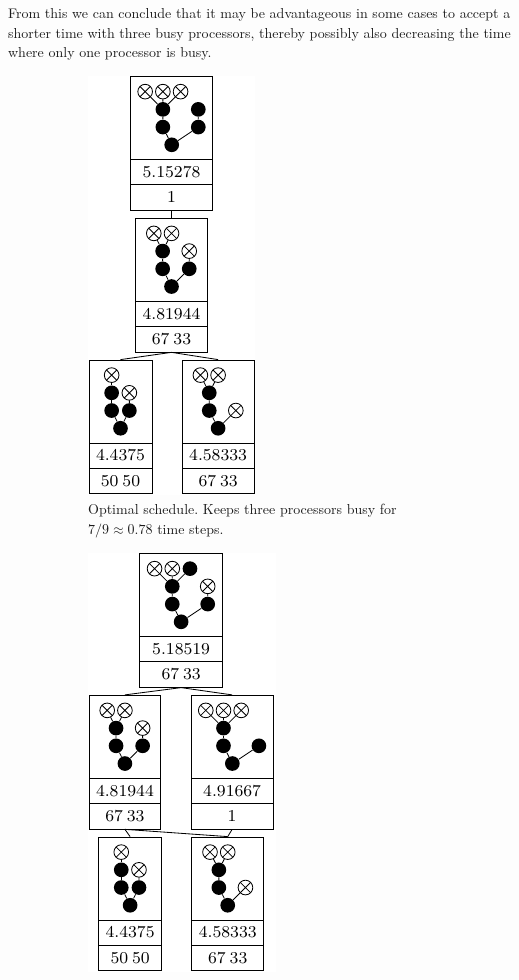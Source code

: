 From this we can conclude that it may be advantageous in some cases to accept a shorter time with three busy processors, thereby possibly also decreasing the time where only one processor is busy.

\begin{figure}[ht]
  \centering
  \begin{subfigure}{.45\linewidth}
    \centering
    \includegraphics{p3/keep_3_busy/three_busy_opt.pdf}
    \caption{Optimal schedule. Keeps three processors busy for $7/9\approx 0.78$ time steps.}
  \end{subfigure}
  \quad
  \begin{subfigure}{.45\linewidth}
    \centering
    \includegraphics{p3/keep_3_busy/three_busy_subopt.pdf}

\end{subfigure}
\end{figure}
